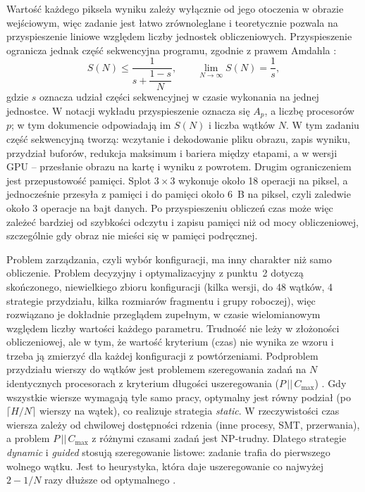 \documentclass[12pt,a4paper]{article}
\begin{document}
Wartość każdego piksela wyniku zależy wyłącznie od jego otoczenia w obrazie wejściowym, więc zadanie jest łatwo zrównoleglane i teoretycznie pozwala na przyspieszenie liniowe względem liczby jednostek obliczeniowych. Przyspieszenie ogranicza jednak część sekwencyjna programu, zgodnie z prawem Amdahla \cite{amdahl,czech}:
\begin{equation}
	S(N) \le \frac{1}{s + \dfrac{1 - s}{N}}, \qquad \lim_{N \to \infty} S(N) = \frac{1}{s},
	\label{eq:amdahl}
\end{equation}
gdzie $s$ oznacza udział części sekwencyjnej w czasie wykonania na jednej jednostce. W notacji wykładu \cite{wojcik} przyspieszenie oznacza się $A_p$, a liczbę procesorów $p$; w tym dokumencie odpowiadają im $S(N)$ i liczba wątków $N$. W tym zadaniu część sekwencyjną tworzą: wczytanie i dekodowanie pliku obrazu, zapis wyniku, przydział buforów, redukcja maksimum i bariera między etapami, a w wersji GPU -- przesłanie obrazu na kartę i wyniku z powrotem. Drugim ograniczeniem jest przepustowość pamięci. Splot $3 \times 3$ wykonuje około 18 operacji na piksel, a jednocześnie przesyła z pamięci i do pamięci około 6~B na piksel, czyli zaledwie około 3 operacje na bajt danych. Po przyspieszeniu obliczeń czas może więc zależeć bardziej od szybkości odczytu i zapisu pamięci niż od mocy obliczeniowej, szczególnie gdy obraz nie mieści się w pamięci podręcznej.

Problem zarządzania, czyli wybór konfiguracji, ma inny charakter niż samo obliczenie. Problem decyzyjny i optymalizacyjny z punktu~2 dotyczą skończonego, niewielkiego zbioru konfiguracji (kilka wersji, do 48 wątków, 4 strategie przydziału, kilka rozmiarów fragmentu i grupy roboczej), więc rozwiązano je dokładnie przeglądem zupełnym, w czasie wielomianowym względem liczby wartości każdego parametru. Trudność nie leży w złożoności obliczeniowej, ale w tym, że wartość kryterium (czas) nie wynika ze wzoru i trzeba ją zmierzyć dla każdej konfiguracji z powtórzeniami. Podproblem przydziału wierszy do wątków jest problemem szeregowania zadań na $N$ identycznych procesorach z kryterium długości uszeregowania ($P\,||\,C_{\max}$) \cite{blazewicz}. Gdy wszystkie wiersze wymagają tyle samo pracy, optymalny jest równy podział (po $\lceil H/N \rceil$ wierszy na wątek), co realizuje strategia \emph{static}. W rzeczywistości czas wiersza zależy od chwilowej dostępności rdzenia (inne procesy, SMT, przerwania), a problem $P\,||\,C_{\max}$ z różnymi czasami zadań jest NP-trudny. Dlatego strategie \emph{dynamic} i \emph{guided} stosują szeregowanie listowe: zadanie trafia do pierwszego wolnego wątku. Jest to heurystyka, która daje uszeregowanie co najwyżej $2 - 1/N$ razy dłuższe od optymalnego \cite{blazewicz}.
\end{document}
